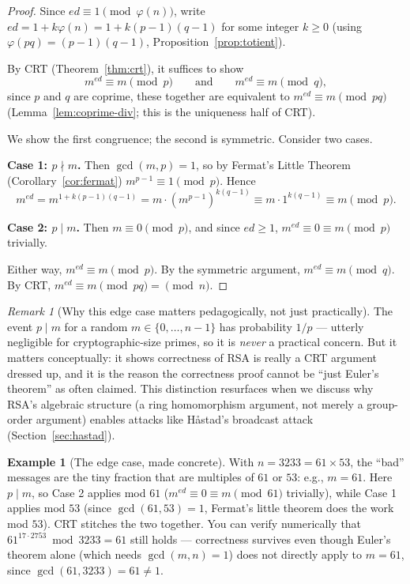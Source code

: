 \documentclass[11pt]{article}
\theoremstyle{definition}
\newtheorem{example}[theorem]{Example}
\theoremstyle{remark}
\newtheorem{remark}[theorem]{Remark}
\begin{document}
\begin{proof}
Since $ed \equiv 1 \pmod{\varphi(n)}$, write $ed = 1 + k\varphi(n) = 1 + k(p-1)(q-1)$ for some integer $k \geq 0$ (using $\varphi(pq)=(p-1)(q-1)$, Proposition~\ref{prop:totient}).

By CRT (Theorem~\ref{thm:crt}), it suffices to show
\[
m^{ed} \equiv m \pmod p \qquad \text{and} \qquad m^{ed} \equiv m \pmod q,
\]
since $p$ and $q$ are coprime, these together are equivalent to $m^{ed} \equiv m \pmod{pq}$ (Lemma~\ref{lem:coprime-div}; this is the uniqueness half of CRT).

We show the first congruence; the second is symmetric. Consider two cases.

\textbf{Case 1: $p \nmid m$.} Then $\gcd(m, p) = 1$, so by Fermat's Little Theorem (Corollary~\ref{cor:fermat}) $m^{p-1} \equiv 1 \pmod p$. Hence
\[
m^{ed} = m^{1 + k(p-1)(q-1)} = m \cdot \left(m^{p-1}\right)^{k(q-1)} \equiv m \cdot 1^{k(q-1)} \equiv m \pmod p.
\]

\textbf{Case 2: $p \mid m$.} Then $m \equiv 0 \pmod p$, and since $ed \geq 1$, $m^{ed} \equiv 0 \equiv m \pmod p$ trivially.

Either way, $m^{ed} \equiv m \pmod p$. By the symmetric argument, $m^{ed} \equiv m \pmod q$. By CRT, $m^{ed} \equiv m \pmod{pq} = \pmod n$.
\end{proof}

\begin{remark}[Why this edge case matters pedagogically, not just practically]
The event $p \mid m$ for a random $m \in \{0,\dots,n-1\}$ has probability $1/p$ — utterly negligible for cryptographic-size primes, so it is \emph{never} a practical concern. But it matters conceptually: it shows correctness of RSA is really a CRT argument dressed up, and it is the reason the correctness proof cannot be ``just Euler's theorem'' as often claimed. This distinction resurfaces when we discuss why RSA's algebraic structure (a ring homomorphism argument, not merely a group-order argument) enables attacks like Håstad's broadcast attack (Section~\ref{sec:hastad}).
\end{remark}

\begin{example}[The edge case, made concrete]
With $n = 3233 = 61 \times 53$, the ``bad'' messages are the tiny fraction that are multiples of $61$ or $53$: e.g., $m = 61$. Here $p \mid m$, so Case 2 applies mod $61$ ($m^{ed} \equiv 0 \equiv m \pmod{61}$ trivially), while Case 1 applies mod $53$ (since $\gcd(61,53)=1$, Fermat's little theorem does the work mod $53$). CRT stitches the two together. You can verify numerically that $61^{17 \cdot 2753} \bmod 3233 = 61$ still holds — correctness survives even though Euler's theorem alone (which needs $\gcd(m,n)=1$) does not directly apply to $m=61$, since $\gcd(61,3233)=61 \ne 1$.
\end{example}
\end{document}
